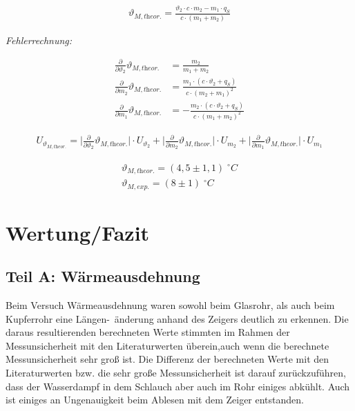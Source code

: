 \documentclass[a4paper]{scrartcl}
\numberwithin{equation}{subsection}
\begin{document}
\begin{align}
\vartheta_{M, \textit{theor.}} = \frac{\vartheta_2 \cdot c \cdot m_2 - m_1 \cdot q_S}{c \cdot (m_1 + m_2)}
\end{align}

\textit{Fehlerrechnung:}

\begin{align*}
\frac{\partial}{\partial \vartheta_2} \vartheta_{M, \textit{theor.}} &= \frac{m_2}{m_1 + m_2} \\
\frac{\partial}{\partial m_2} \vartheta_{M, \textit{theor.}} &= \frac{m_1 \cdot (c \cdot \vartheta_2 + q_S)}{c \cdot (m_2+m_1)^2} \\
\frac{\partial}{\partial m_1} \vartheta_{M, \textit{theor.}} &= -\frac{m_2 \cdot (c \cdot \vartheta_2 + q_S)}{c\cdot(m_1+m_2)^2}
\end{align*}

\begin{align*}
U_{\vartheta_{M, \textit{theor.}}} = \bigg | \frac{\partial}{\partial \vartheta_2} \vartheta_{M, \textit{theor.}} \bigg | \cdot U_{\vartheta_2} + 
									\bigg | \frac{\partial}{\partial m_2} \vartheta_{M, \textit{theor.}} \bigg | \cdot U_{m_2} +
									\bigg | \frac{\partial}{\partial m_1} \vartheta_{M, \textit{theor.}} \bigg | \cdot U_{m_1}
\end{align*}

\begin{align*}
\vartheta_{M, \textit{theor.}} = (4,5\pm1,1)\; ^\circ C \\
\vartheta_{M, \textit{exp.}} = (8\pm1)\; ^\circ C
\end{align*}

\newpage
\section{Wertung/Fazit}
\subsection{Teil A: Wärmeausdehnung}
Beim Versuch Wärmeausdehnung waren sowohl beim Glasrohr, als auch beim Kupferrohr eine Längen-\ änderung anhand des Zeigers deutlich zu erkennen. Die daraus resultierenden berechneten Werte stimmten im Rahmen der Messunsicherheit mit den Literaturwerten überein,auch wenn die berechnete Messunsicherheit sehr groß ist. Die Differenz der berechneten Werte mit den Literaturwerten bzw. die sehr große Messunsicherheit ist darauf zurückzuführen, dass der Wasserdampf in dem Schlauch aber auch im Rohr einiges abkühlt. Auch ist einiges an Ungenauigkeit beim Ablesen mit dem Zeiger entstanden.
\end{document}
